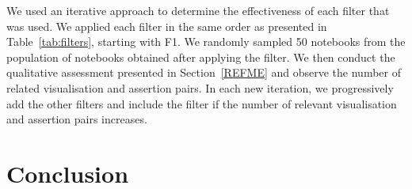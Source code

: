 \documentclass[conference]{IEEEtran}
\begin{document}
We used an iterative approach to determine the effectiveness of each filter that was used. We applied each filter in the same order as presented in Table~\ref{tab:filters}, starting with F1. We randomly sampled 50 notebooks from the population of notebooks obtained after applying the filter. We then conduct the qualitative assessment presented in Section~\ref{REFME} and observe the number of related visualisation and assertion pairs. In each new iteration, we progressively add the other filters and include the filter if the number of relevant visualisation and assertion pairs increases.


\section{Conclusion}\label{sec:conclude}



\end{document}
